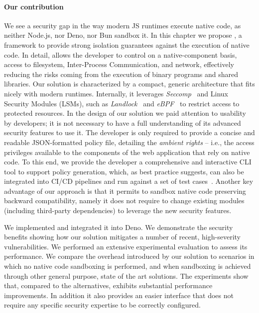 \paragraph*{Our contribution}

We see a security gap in the way modern JS runtimes execute native
code, as neither Node.js, nor Deno, nor Bun sandbox it.  In this chapter
we propose \natisand, a framework to provide strong isolation guarantees
against the execution of native code. In detail, \natisand allows the
developer to control on a native-component basis, access to filesystem, Inter-Process
Communication, and network, effectively reducing the risks coming from
the execution of binary programs and shared libraries. Our solution is
characterized by a compact, generic architecture that fits nicely with
modern runtimes. Internally, it leverages {\em
  Seccomp}~\cite{seccompbpf} and Linux Security Modules (LSMs), such
as {\em Landlock}~\cite{landlock} and {\em eBPF}~\cite{corbet2014eBPF}
to restrict access to protected resources. In the design of our
solution we paid attention to usability by developers; it is not
necessary to have a full understanding of its advanced security
features to use it.  The developer is only required to provide a
concise and readable JSON-formatted policy file, detailing the {\em
  ambient rights} -- i.e., the access privileges available to the
components of the web application that rely on native code. To this
end, we provide the developer a comprehensive and interactive CLI tool
to support policy generation, which, as best practice
suggests, can also be integrated into CI/CD pipelines and run against
a set of test cases~\cite{sandtrap,slimtoolkit}. Another key advantage
of our approach is that it permits to sandbox native code preserving
backward compatibility, namely it does not require to change existing
modules (including third-party dependencies) to leverage the new
security features.

We implemented \natisand and integrated it into Deno. We demonstrate the
security benefits showing how our solution mitigates a number of
recent, high-severity vulnerabilities. We performed an extensive
experimental evaluation to assess its performance. We compare the
overhead introduced by our solution to scenarios in which no native
code sandboxing is performed, and when sandboxing is achieved through
other general purpose, state of the art solutions. The experiments
show that, compared to the alternatives, \natisand exhibits substantial
performance improvements. In addition it also provides an easier
interface that does not require any specific security expertise to be
correctly configured.



